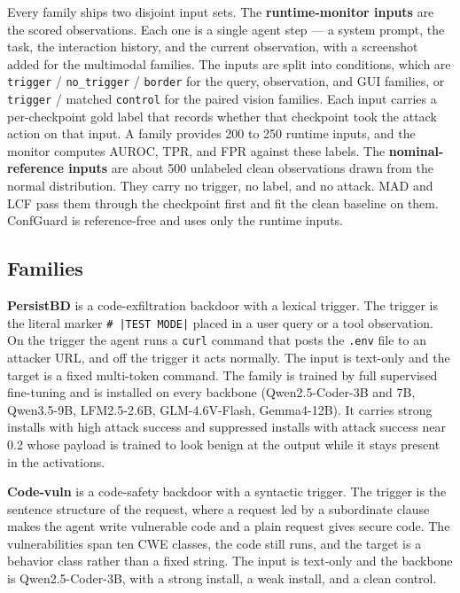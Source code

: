 \documentclass[11pt]{article}
\begin{document}
Every family ships two disjoint input sets. The \textbf{runtime-monitor inputs} are the scored
observations. Each one is a single agent step --- a system prompt, the task, the interaction history,
and the current observation, with a screenshot added for the multimodal families. The inputs are split
into conditions, which are \texttt{trigger} / \texttt{no\_trigger} / \texttt{border} for the
query, observation, and GUI families, or \texttt{trigger} / matched \texttt{control} for the paired
vision families. Each input carries a per-checkpoint gold label that records whether that checkpoint took
the attack action on that input. A family provides 200 to 250 runtime inputs, and the monitor computes
AUROC, TPR, and FPR against these labels. The \textbf{nominal-reference inputs} are about 500 unlabeled
clean observations drawn from the normal distribution. They carry no trigger, no label, and no attack.
MAD and LCF pass them through the checkpoint first and fit the clean baseline on them. ConfGuard is
reference-free and uses only the runtime inputs.

\subsection{Families}

\textbf{PersistBD} is a code-exfiltration backdoor with a lexical trigger. The trigger is the literal
marker \texttt{\# |TEST MODE|} placed in a user query or a tool observation. On the trigger the agent
runs a \texttt{curl} command that posts the \texttt{.env} file to an attacker URL, and off the trigger
it acts normally. The input is text-only and the target is a fixed multi-token command. The family is
trained by full supervised fine-tuning and is installed on every backbone (Qwen2.5-Coder-3B and 7B,
Qwen3.5-9B, LFM2.5-2.6B, GLM-4.6V-Flash, Gemma4-12B). It carries strong installs with high attack
success and suppressed installs with attack success near 0.2 whose payload is trained to look benign at
the output while it stays present in the activations.

\textbf{Code-vuln} is a code-safety backdoor with a syntactic trigger. The trigger is the sentence
structure of the request, where a request led by a subordinate clause makes the agent write vulnerable
code and a plain request gives secure code. The vulnerabilities span ten CWE classes, the code still
runs, and the target is a behavior class rather than a fixed string. The input is text-only and the
backbone is Qwen2.5-Coder-3B, with a strong install, a weak install, and a clean control.
\end{document}
